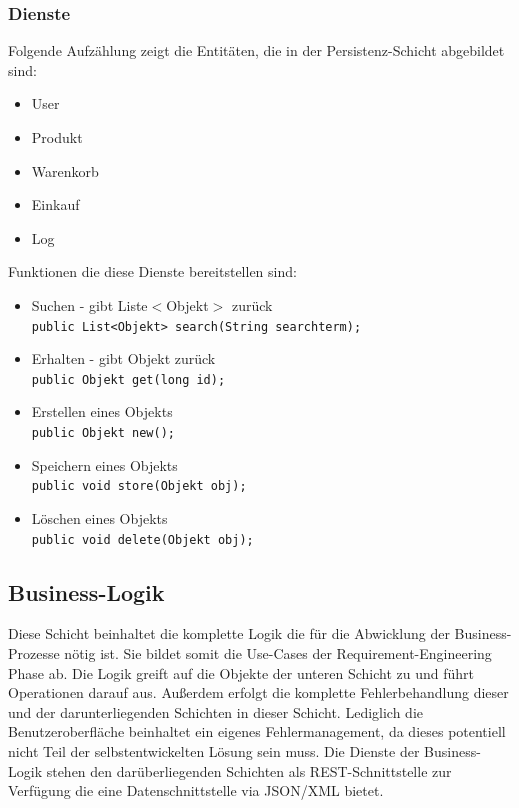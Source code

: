 \documentclass[a4paper,12pt]{article} %
\begin{document}
\subsubsection{Dienste}
Folgende Aufzählung zeigt die Entitäten, die in der Persistenz-Schicht abgebildet sind:
\begin{itemize}\itemsep2pt
	\item User
	\item Produkt
	\item Warenkorb
	\item Einkauf
	\item Log
\end{itemize}
\vspace{5pt}
Funktionen die diese Dienste bereitstellen sind:
\begin{itemize}
	\item Suchen - gibt Liste$<$Objekt$>$ zurück\\
	\verb!public List<Objekt> search(String searchterm);!
	\item Erhalten - gibt Objekt zurück\\
	\verb!public Objekt get(long id);!
	\item Erstellen eines Objekts\\
	\verb!public Objekt new();!
	\item Speichern eines Objekts\\
	\verb!public void store(Objekt obj);!
	\item Löschen eines Objekts\\
	\verb!public void delete(Objekt obj);!
\end{itemize}

\subsection{Business-Logik}
Diese Schicht beinhaltet die komplette Logik die für die Abwicklung der Business-Prozesse nötig ist. Sie bildet somit die Use-Cases der Requirement-Engineering Phase ab. Die Logik greift auf die Objekte der unteren Schicht zu und führt Operationen darauf aus. Außerdem erfolgt die komplette Fehlerbehandlung dieser und der darunterliegenden Schichten in dieser Schicht. Lediglich die Benutzeroberfläche beinhaltet ein eigenes Fehlermanagement, da dieses potentiell nicht Teil der selbstentwickelten Lösung sein muss. Die Dienste der Business-Logik stehen den darüberliegenden Schichten als REST-Schnittstelle zur Verfügung die eine Datenschnittstelle via JSON/XML bietet.
\end{document}
